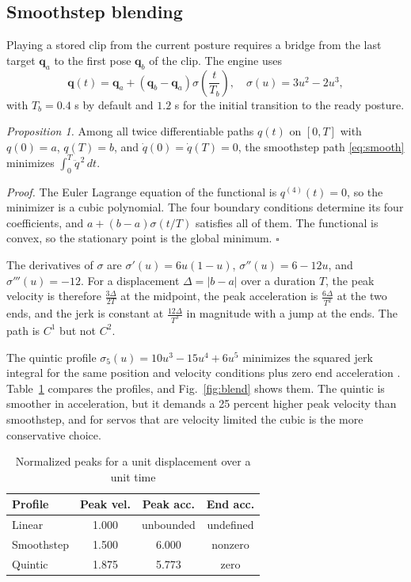 \documentclass[10pt,journal]{IEEEtran}
\begin{document}
\subsection{Smoothstep blending}
Playing a stored clip from the current posture requires a bridge from the last target $\mathbf{q}_a$ to the first pose $\mathbf{q}_b$ of the clip. The engine uses
\begin{equation}
\mathbf{q}(t)=\mathbf{q}_a+\left(\mathbf{q}_b-\mathbf{q}_a\right)\sigma\!\left(\frac{t}{T_b}\right),\quad \sigma(u)=3u^2-2u^3,
\label{eq:smooth}
\end{equation}
with $T_b=0.4$ s by default and $1.2$ s for the initial transition to the ready posture.

\medskip
\noindent\textit{Proposition 1.} Among all twice differentiable paths $q(t)$ on $[0,T]$ with $q(0)=a$, $q(T)=b$, and $\dot q(0)=\dot q(T)=0$, the smoothstep path \eqref{eq:smooth} minimizes $\int_0^T\ddot q^{\,2}\,dt$.

\medskip
\noindent\textit{Proof.} The Euler Lagrange equation of the functional is $q^{(4)}(t)=0$, so the minimizer is a cubic polynomial. The four boundary conditions determine its four coefficients, and $a+(b-a)\sigma(t/T)$ satisfies all of them. The functional is convex, so the stationary point is the global minimum. $\square$

The derivatives of $\sigma$ are $\sigma'(u)=6u(1-u)$, $\sigma''(u)=6-12u$, and $\sigma'''(u)=-12$. For a displacement $\Delta=\lvert b-a\rvert$ over a duration $T$, the peak velocity is therefore $\tfrac{3\Delta}{2T}$ at the midpoint, the peak acceleration is $\tfrac{6\Delta}{T^2}$ at the two ends, and the jerk is constant at $\tfrac{12\Delta}{T^3}$ in magnitude with a jump at the ends. The path is $C^1$ but not $C^2$.

The quintic profile $\sigma_5(u)=10u^3-15u^4+6u^5$ minimizes the squared jerk integral for the same position and velocity conditions plus zero end acceleration \cite{flash1985}. Table~\ref{tab:profiles} compares the profiles, and Fig.~\ref{fig:blend} shows them. The quintic is smoother in acceleration, but it demands a 25 percent higher peak velocity than smoothstep, and for servos that are velocity limited the cubic is the more conservative choice.

\begin{table}[t]
\centering
\caption{Normalized peaks for a unit displacement over a unit time}
\label{tab:profiles}
\small
\begin{tabular}{lccc}
\toprule
Profile & Peak vel. & Peak acc. & End acc.\\
\midrule
Linear & 1.000 & unbounded & undefined\\
Smoothstep & 1.500 & 6.000 & nonzero\\
Quintic & 1.875 & 5.773 & zero\\
\bottomrule
\end{tabular}
\end{table}
\end{document}
